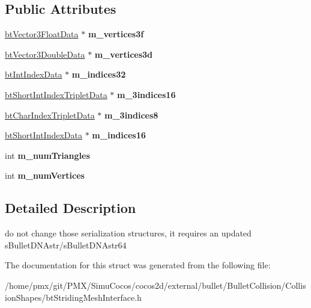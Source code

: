 \subsection*{Public Attributes}
\begin{DoxyCompactItemize}
\item 
\mbox{\label{structbtMeshPartData_a9a2de183f66dfbaa496c2d5a2324aa70}} 
\hyperlink{structbtVector3FloatData}{bt\+Vector3\+Float\+Data} $\ast$ {\bfseries m\+\_\+vertices3f}
\item 
\mbox{\label{structbtMeshPartData_ae0a827cf3fe0799a3163e02926489dca}} 
\hyperlink{structbtVector3DoubleData}{bt\+Vector3\+Double\+Data} $\ast$ {\bfseries m\+\_\+vertices3d}
\item 
\mbox{\label{structbtMeshPartData_a61e6090afdc71ec7f3f074b62e4cb7c1}} 
\hyperlink{structbtIntIndexData}{bt\+Int\+Index\+Data} $\ast$ {\bfseries m\+\_\+indices32}
\item 
\mbox{\label{structbtMeshPartData_a69fc1cfed14d29edad519323a22d7b12}} 
\hyperlink{structbtShortIntIndexTripletData}{bt\+Short\+Int\+Index\+Triplet\+Data} $\ast$ {\bfseries m\+\_\+3indices16}
\item 
\mbox{\label{structbtMeshPartData_a048d6270674d68e1dd8a9b444a63a732}} 
\hyperlink{structbtCharIndexTripletData}{bt\+Char\+Index\+Triplet\+Data} $\ast$ {\bfseries m\+\_\+3indices8}
\item 
\mbox{\label{structbtMeshPartData_a6c29400fcd75df1b3129adf844fdf993}} 
\hyperlink{structbtShortIntIndexData}{bt\+Short\+Int\+Index\+Data} $\ast$ {\bfseries m\+\_\+indices16}
\item 
\mbox{\label{structbtMeshPartData_ab9b3399ff8ab865c5388a0da23037bc2}} 
int {\bfseries m\+\_\+num\+Triangles}
\item 
\mbox{\label{structbtMeshPartData_a00ac662304bd95c82880f969c9b9c166}} 
int {\bfseries m\+\_\+num\+Vertices}
\end{DoxyCompactItemize}


\subsection{Detailed Description}
do not change those serialization structures, it requires an updated s\+Bullet\+D\+N\+Astr/s\+Bullet\+D\+N\+Astr64 

The documentation for this struct was generated from the following file\+:\begin{DoxyCompactItemize}
\item 
/home/pmx/git/\+P\+M\+X/\+Simu\+Cocos/cocos2d/external/bullet/\+Bullet\+Collision/\+Collision\+Shapes/bt\+Striding\+Mesh\+Interface.\+h\end{DoxyCompactItemize}
